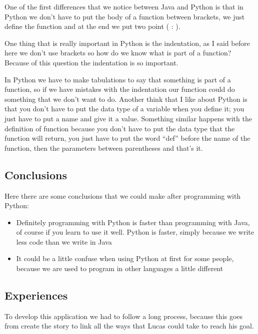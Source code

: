 \documentclass[12pt,letterpaper]{article}
\begin{document}
\begin{raggedleft}
One of the first differences that we notice between Java and Python is that in Python we don't have to put the body of a function between brackets, we just define the function and at the end we put two point ( : ).
\end{raggedleft}


\begin{raggedleft}
One thing that is really important in Python is the indentation, as I said before here we don’t use brackets so how do we know what is part of a function? Because of this question the indentation is so important.
\end{raggedleft}


\begin{raggedleft}
In Python we have to make tabulations to say that something is part of a function, so if we have mistakes with the indentation our function could do something that we don't want to do.
Another think that I like about Python is that you don't have to put the data type of a variable when you define it; you just have to put a name and give it a value.
Something similar happens with the definition of function because you don't have to put the data type that the function will return, you just have to put the word “def” before the name of the function, then the parameters between parentheses and that's it.
\end{raggedleft}

\subsection{Conclusions}
Here there are some conclusions that we could make after programming with Python:
\begin{itemize}
\item
Definitely programming with Python is faster than programming with Java, of course if you learn to use it well. Python is faster, simply because we write less code than we write in Java
\item
It could be a little confuse when using Python at first for some people, because we are used to program in other languages a little different
\end{itemize}

\subsection{Experiences}
\begin{raggedleft}
To develop this application we had to follow a long process, because this goes from create the story to link all the ways that Lucas could take to reach his goal.
\end{raggedleft}
\end{document}
